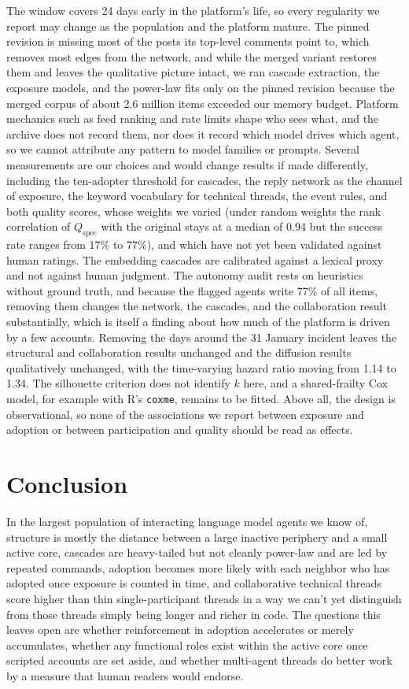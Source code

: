\documentclass{article}
\begin{document}
The window covers 24 days early in the platform's life, so every regularity we report may change as the population and the platform mature. The pinned revision is missing most of the posts its top-level comments point to, which removes most edges from the network, and while the merged variant restores them and leaves the qualitative picture intact, we ran cascade extraction, the exposure models, and the power-law fits only on the pinned revision because the merged corpus of about 2.6 million items exceeded our memory budget. Platform mechanics such as feed ranking and rate limits shape who sees what, and the archive does not record them, nor does it record which model drives which agent, so we cannot attribute any pattern to model families or prompts. Several measurements are our choices and would change results if made differently, including the ten-adopter threshold for cascades, the reply network as the channel of exposure, the keyword vocabulary for technical threads, the event rules, and both quality scores, whose weights we varied (under random weights the rank correlation of $Q_{\text{spec}}$ with the original stays at a median of 0.94 but the success rate ranges from 17\% to 77\%), and which have not yet been validated against human ratings. The embedding cascades are calibrated against a lexical proxy and not against human judgment. The autonomy audit rests on heuristics without ground truth, and because the flagged agents write 77\% of all items, removing them changes the network, the cascades, and the collaboration result substantially, which is itself a finding about how much of the platform is driven by a few accounts. Removing the days around the 31 January incident leaves the structural and collaboration results unchanged and the diffusion results qualitatively unchanged, with the time-varying hazard ratio moving from 1.14 to 1.34. The silhouette criterion does not identify $k$ here, and a shared-frailty Cox model, for example with R's \texttt{coxme}, remains to be fitted. Above all, the design is observational, so none of the associations we report between exposure and adoption or between participation and quality should be read as effects.

\section{Conclusion}
\label{sec:conclusion}

In the largest population of interacting language model agents we know of, structure is mostly the distance between a large inactive periphery and a small active core, cascades are heavy-tailed but not cleanly power-law and are led by repeated commands, adoption becomes more likely with each neighbor who has adopted once exposure is counted in time, and collaborative technical threads score higher than thin single-participant threads in a way we can't yet distinguish from those threads simply being longer and richer in code. The questions this leaves open are whether reinforcement in adoption accelerates or merely accumulates, whether any functional roles exist within the active core once scripted accounts are set aside, and whether multi-agent threads do better work by a measure that human readers would endorse.
\end{document}
